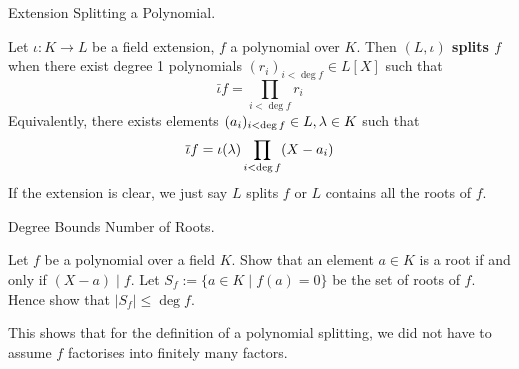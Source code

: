 \documentclass[../book.tex]{subfiles}
\begin{document}
\begin{dfn} Extension Splitting a Polynomial. 
    
    Let $\iota : K \to L$ be a field extension, $f$ a polynomial over $K$. 
    Then \textbf{$(L,\iota)$ splits $f$} when there exist degree 1 polynomials
    $(r_i)_{i<\deg f} \in L[X]$ such that \[
        \bar\iota f = \prod_{i<\deg f} r_i
    \]
    Equivalently, there exists elements $(a_i)_{i<\deg f} \in L, \lambda \in K$ 
    such that \[
        \overline{\iota} f = \iota(\lambda)\prod_{i<\deg f} (X - a_i)
    \]
    If the extension is clear, we just say $L$ splits $f$ or
    $L$ contains all the roots of $f$. 
\end{dfn}

\begin{ex} Degree Bounds Number of Roots. 

    Let $f$ be a polynomial over a field $K$.
    Show that an element $a \in K$ is a root if and only if $(X-a) \mid f$.
    Let $S_f := \{a \in K \mid f(a) = 0\}$ be the set of roots of $f$. 
    Hence show that $|S_f| \leq \deg f$.
    
    This shows that for the definition of a polynomial splitting, 
    we did not have to assume $f$ factorises into finitely
    many factors. 
\end{ex}
\end{document}

